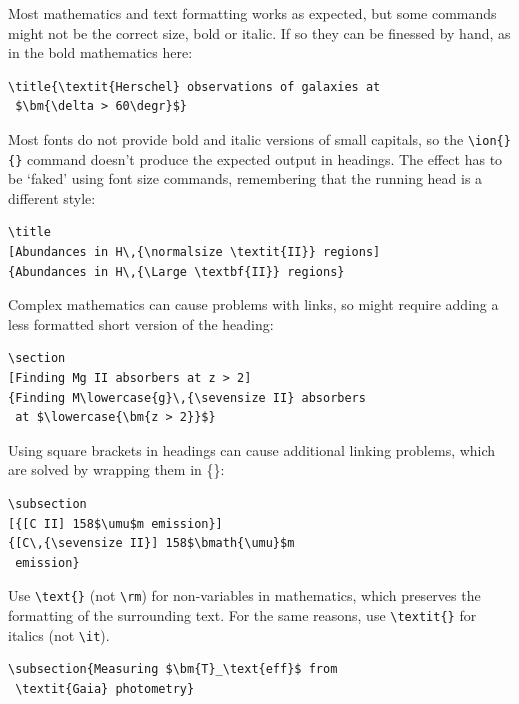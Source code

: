 \documentclass[fleqn,usenatbib,useAMS]{rasti}
\begin{document}
Most mathematics and text formatting works as expected, but some commands might not be the correct size, bold or italic.
If so they can be finessed by hand, as in the bold mathematics here:
\begin{verbatim}
\title{\textit{Herschel} observations of galaxies at
 $\bm{\delta > 60\degr}$}
\end{verbatim}

Most fonts do not provide bold and italic versions of small capitals, so the \verb'\ion{}{}' command doesn't produce the expected output in headings.
The effect has to be `faked' using font size commands, remembering that the running head is a different style:
\begin{verbatim}
\title
[Abundances in H\,{\normalsize \textit{II}} regions]
{Abundances in H\,{\Large \textbf{II}} regions}
\end{verbatim}

Complex mathematics can cause problems with links, so might require adding a less formatted short version of the heading:
\begin{verbatim}
\section
[Finding Mg II absorbers at z > 2]
{Finding M\lowercase{g}\,{\sevensize II} absorbers
 at $\lowercase{\bm{z > 2}}$}
\end{verbatim}


Using square brackets in headings can cause additional linking problems, which are solved by wrapping them in \{\textellipsis\}:
\begin{verbatim}
\subsection
[{[C II] 158$\umu$m emission}]
{[C\,{\sevensize II}] 158$\bmath{\umu}$m
 emission}
\end{verbatim}

Use \verb'\text{}' (not \verb'\rm') for non-variables in mathematics, which preserves the formatting of the surrounding text.
For the same reasons, use \verb'\textit{}' for italics (not \verb'\it').
\begin{verbatim}
\subsection{Measuring $\bm{T}_\text{eff}$ from
 \textit{Gaia} photometry}
\end{verbatim}
\end{document}
